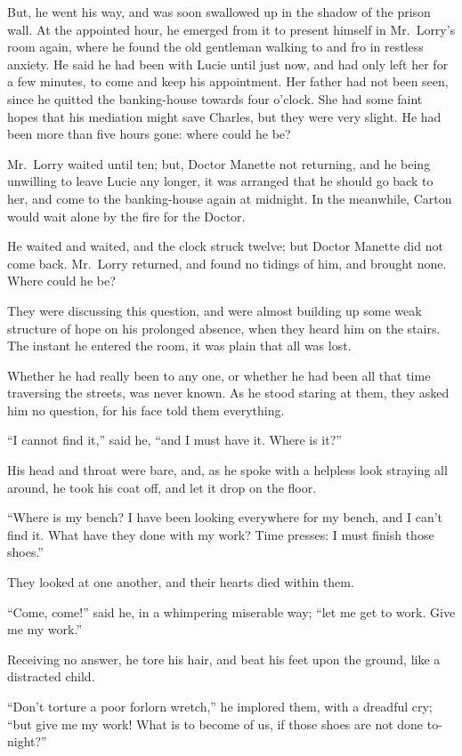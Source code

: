 But, he went his way, and was soon swallowed up in the shadow of the
prison wall.  At the appointed hour, he emerged from it to present
himself in Mr.\ Lorry's room again, where he found the old gentleman
walking to and fro in restless anxiety.  He said he had been with
Lucie until just now, and had only left her for a few minutes, to
come and keep his appointment.  Her father had not been seen, since
he quitted the banking-house towards four o'clock.  She had some
faint hopes that his mediation might save Charles, but they were very
slight.  He had been more than five hours gone:  where could he be?

Mr.\ Lorry waited until ten; but, Doctor Manette not returning, and he
being unwilling to leave Lucie any longer, it was arranged that he
should go back to her, and come to the banking-house again at midnight.
In the meanwhile, Carton would wait alone by the fire for the Doctor.

He waited and waited, and the clock struck twelve; but Doctor Manette
did not come back.  Mr.\ Lorry returned, and found no tidings of him,
and brought none.  Where could he be?

They were discussing this question, and were almost building up some
weak structure of hope on his prolonged absence, when they heard him
on the stairs.  The instant he entered the room, it was plain that
all was lost.

Whether he had really been to any one, or whether he had been all
that time traversing the streets, was never known.  As he stood
staring at them, they asked him no question, for his face told them
everything.

``I cannot find it,'' said he, ``and I must have it.  Where is it?''

His head and throat were bare, and, as he spoke with a helpless look
straying all around, he took his coat off, and let it drop on the floor.

``Where is my bench?  I have been looking everywhere for my bench, and
I can't find it.  What have they done with my work?  Time presses:
I must finish those shoes.''

They looked at one another, and their hearts died within them.

``Come, come!'' said he, in a whimpering miserable way; ``let me get to work.
Give me my work.''

Receiving no answer, he tore his hair, and beat his feet upon the ground,
like a distracted child.

``Don't torture a poor forlorn wretch,'' he implored them, with a dreadful cry;
``but give me my work!  What is to become of us, if those shoes are not done
to-night?''

